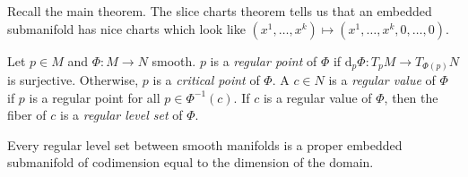
Recall the main theorem. The slice charts theorem tells us that an embedded submanifold has nice charts which look like $(x^1, \ldots ,x^k)\mapsto (x^1, \ldots ,x^k,0, \ldots ,0)$.

\begin{definition}\label{2.1.11}
	Let $p\in M$ and $\Phi : M \to N$ smooth. $p$ is a \emph{regular point} of $\Phi $ if $\mathrm{d}_p\Phi : T_pM \to T_{\Phi (p)} N$ is surjective. Otherwise, $p$ is a \emph{critical point} of $\Phi $. A $c\in N$ is a \emph{regular value} of $\Phi $ if $p$ is a regular point for all $p\in \Phi ^{-1} (c)$. If $c$ is a regular value of $\Phi $, then the fiber of $c$ is a \emph{regular level set} of $\Phi $.
\end{definition}

\begin{corollary}\label{2.1.12}
	Every regular level set between smooth manifolds is a proper embedded submanifold of codimension equal to the dimension of the domain.
\end{corollary}


